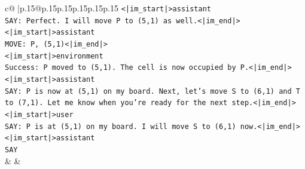 \documentclass{article}
\begin{document}
{\begin{supertabular}{c@{$\;$}|p{.15\linewidth}@{}p{.15\linewidth}p{.15\linewidth}p{.15\linewidth}p{.15\linewidth}p{.15\linewidth}}
{{{\texttt{<|im\_start|>assistant} \\
\texttt{SAY: Perfect. I will move P to (5,1) as well.<|im\_end|>} \\
\texttt{<|im\_start|>assistant} \\
\texttt{MOVE: P, (5,1)<|im\_end|>} \\
\texttt{<|im\_start|>environment} \\
\texttt{Success: P moved to (5,1). The cell is now occupied by P.<|im\_end|>} \\
\texttt{<|im\_start|>assistant} \\
\texttt{SAY: P is now at (5,1) on my board. Next, let's move S to (6,1) and T to (7,1). Let me know when you're ready for the next step.<|im\_end|>} \\
\texttt{<|im\_start|>user} \\
\texttt{SAY: P is at (5,1) on my board. I will move S to (6,1) now.<|im\_end|>} \\
\texttt{<|im\_start|>assistant} \\
\texttt{SAY} \\
            }
        }
    }
    & & \\ \\


\end{supertabular}}
\end{document}
